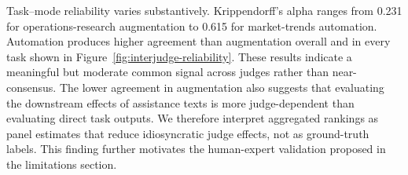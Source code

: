 Task--mode reliability varies substantively. Krippendorff's alpha ranges from
0.231 for operations-research augmentation to 0.615 for market-trends
automation. Automation produces higher agreement than augmentation overall
and in every task shown in Figure~\ref{fig:interjudge-reliability}. These
results indicate a meaningful but moderate common signal across judges rather
than near-consensus. The lower agreement in augmentation also suggests that
evaluating the downstream effects of assistance texts is more
judge-dependent than evaluating direct task outputs. We therefore interpret
aggregated rankings as panel estimates that reduce idiosyncratic judge effects,
not as ground-truth labels. This finding further motivates the human-expert
validation proposed in the limitations section.
